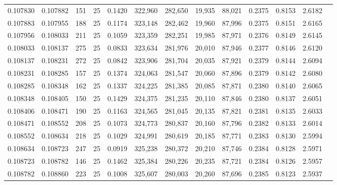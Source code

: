 \begin{tabular}{rrrrrrrrrrrrr}
0.107830 & 0.107882 &   151 &  25 &                                     0.1420 & 322,960 & 282,650 &  19,935 &  88,021 & 0.2375 & 0.8153 & 2.6182 \\
0.107883 & 0.107955 &   188 &  25 &                                     0.1174 & 323,148 & 282,462 &  19,960 &  87,996 & 0.2375 & 0.8151 & 2.6165 \\
0.107956 & 0.108033 &   211 &  25 &                                     0.1059 & 323,359 & 282,251 &  19,985 &  87,971 & 0.2376 & 0.8149 & 2.6145 \\
0.108033 & 0.108137 &   275 &  25 &                                     0.0833 & 323,634 & 281,976 &  20,010 &  87,946 & 0.2377 & 0.8146 & 2.6120 \\
0.108137 & 0.108231 &   272 &  25 &                                     0.0842 & 323,906 & 281,704 &  20,035 &  87,921 & 0.2379 & 0.8144 & 2.6094 \\
0.108231 & 0.108285 &   157 &  25 &                                     0.1374 & 324,063 & 281,547 &  20,060 &  87,896 & 0.2379 & 0.8142 & 2.6080 \\
0.108285 & 0.108348 &   162 &  25 &                                     0.1337 & 324,225 & 281,385 &  20,085 &  87,871 & 0.2380 & 0.8140 & 2.6065 \\
0.108348 & 0.108405 &   150 &  25 &                                     0.1429 & 324,375 & 281,235 &  20,110 &  87,846 & 0.2380 & 0.8137 & 2.6051 \\
0.108406 & 0.108471 &   190 &  25 &                                     0.1163 & 324,565 & 281,045 &  20,135 &  87,821 & 0.2381 & 0.8135 & 2.6033 \\
0.108471 & 0.108552 &   208 &  25 &                                     0.1073 & 324,773 & 280,837 &  20,160 &  87,796 & 0.2382 & 0.8133 & 2.6014 \\
0.108552 & 0.108634 &   218 &  25 &                                     0.1029 & 324,991 & 280,619 &  20,185 &  87,771 & 0.2383 & 0.8130 & 2.5994 \\
0.108634 & 0.108723 &   247 &  25 &                                     0.0919 & 325,238 & 280,372 &  20,210 &  87,746 & 0.2384 & 0.8128 & 2.5971 \\
0.108723 & 0.108782 &   146 &  25 &                                     0.1462 & 325,384 & 280,226 &  20,235 &  87,721 & 0.2384 & 0.8126 & 2.5957 \\
0.108782 & 0.108860 &   223 &  25 &                                     0.1008 & 325,607 & 280,003 &  20,260 &  87,696 & 0.2385 & 0.8123 & 2.5937 \\

\end{tabular}
